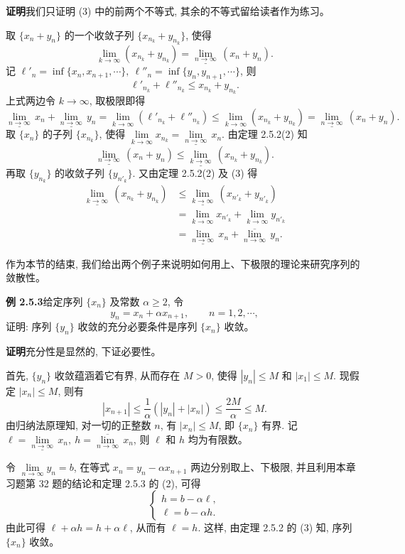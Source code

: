\documentclass[UTF8,12pt,a4paper,fontset=fandol]{ctexart}
\begin{document}
\noindent\textbf{证明}\quad 我们只证明 (3) 中的前两个不等式, 其余的不等式留给读者作为练习。

取 $\{x_n+y_n\}$ 的一个收敛子列 $\{x_{n_k}+y_{n_k}\}$, 使得
\[
  \lim_{k\to\infty}(x_{n_k}+y_{n_k})
  =
  \underline{\lim_{n\to\infty}}\,(x_n+y_n).
\]
记 $\ell'_n=\inf\{x_n,x_{n+1},\cdots\},\ \ell''_n=\inf\{y_n,y_{n+1},\cdots\}$, 则
\[
  \ell'_{n_k}+\ell''_{n_k}\leqslant x_{n_k}+y_{n_k}.
\]
上式两边令 $k\to\infty$, 取极限即得
\[
  \underline{\lim_{n\to\infty}}\,x_n
  +
  \underline{\lim_{n\to\infty}}\,y_n
  =
  \lim_{k\to\infty}(\ell'_{n_k}+\ell''_{n_k})
  \leqslant
  \lim_{k\to\infty}(x_{n_k}+y_{n_k})
  =
  \underline{\lim_{n\to\infty}}\,(x_n+y_n).
\]
取 $\{x_n\}$ 的子列 $\{x_{n_k}\}$, 使得 $\lim\limits_{k\to\infty}x_{n_k}=\underline{\lim\limits_{n\to\infty}}\,x_n$. 由定理 2.5.2(2) 知
\[
  \underline{\lim_{n\to\infty}}\,(x_n+y_n)
  \leqslant
  \underline{\lim_{k\to\infty}}\,(x_{n_k}+y_{n_k}).
\]
再取 $\{y_{n_k}\}$ 的收敛子列 $\{y_{n'_k}\}$. 又由定理 2.5.2(2) 及 (3) 得
\[
\begin{aligned}
  \underline{\lim_{k\to\infty}}\,(x_{n_k}+y_{n_k})
  &\leqslant
  \underline{\lim_{k\to\infty}}\,(x_{n'_k}+y_{n'_k})\\
  &=
  \lim_{k\to\infty}x_{n'_k}+\lim_{k\to\infty}y_{n'_k}\\
  &=
  \underline{\lim_{n\to\infty}}\,x_n
  +
  \overline{\lim_{n\to\infty}}\,y_n.
\end{aligned}
\]

作为本节的结束, 我们给出两个例子来说明如何用上、下极限的理论来研究序列的敛散性。

\noindent\textbf{例 2.5.3}\quad 给定序列 $\{x_n\}$ 及常数 $\alpha\geqslant2$, 令
\[
  y_n=x_n+\alpha x_{n+1},\qquad n=1,2,\cdots,
\]
证明: 序列 $\{y_n\}$ 收敛的充分必要条件是序列 $\{x_n\}$ 收敛。

\noindent\textbf{证明}\quad 充分性是显然的, 下证必要性。

首先, $\{y_n\}$ 收敛蕴涵着它有界, 从而存在 $M>0$, 使得 $|y_n|\leqslant M$ 和 $|x_1|\leqslant M$. 现假定 $|x_n|\leqslant M$, 则有
\[
  |x_{n+1}|\leqslant\frac1\alpha(|y_n|+|x_n|)\leqslant\frac{2M}{\alpha}\leqslant M.
\]
由归纳法原理知, 对一切的正整数 $n$, 有 $|x_n|\leqslant M$, 即 $\{x_n\}$ 有界. 记 $\ell=\underline{\lim\limits_{n\to\infty}}\,x_n,\ h=\overline{\lim\limits_{n\to\infty}}\,x_n$, 则 $\ell$ 和 $h$ 均为有限数。

令 $\lim\limits_{n\to\infty}y_n=b$, 在等式 $x_n=y_n-\alpha x_{n+1}$ 两边分别取上、下极限, 并且利用本章习题第 32 题的结论和定理 2.5.3 的 (2), 可得
\[
  \begin{cases}
    h=b-\alpha\ell,\\
    \ell=b-\alpha h.
  \end{cases}
\]
由此可得 $\ell+\alpha h=h+\alpha\ell$, 从而有 $\ell=h$. 这样, 由定理 2.5.2 的 (3) 知, 序列 $\{x_n\}$ 收敛。
\end{document}
